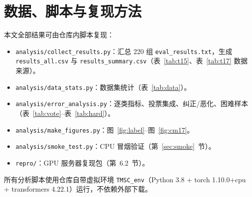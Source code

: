\documentclass[11pt]{ctexart}
\begin{document}
\appendix
\section{数据、脚本与复现方法}

本文全部结果可由仓库内脚本复现：
\begin{itemize}
  \item \texttt{analysis/collect\_results.py}：汇总 220 组 \texttt{eval\_results.txt}，生成 \texttt{results\_all.csv} 与 \texttt{results\_summary.csv}（表~\ref{tab:t15}、表~\ref{tab:t17} 数据来源）。
  \item \texttt{analysis/data\_stats.py}：数据集统计（表~\ref{tab:data}）。
  \item \texttt{analysis/error\_analysis.py}：逐类指标、投票集成、纠正/恶化、困难样本（表~\ref{tab:vote}--表~\ref{tab:hard}）。
  \item \texttt{analysis/make\_figures.py}：图~\ref{fig:label}--图~\ref{fig:cm17}。
  \item \texttt{analysis/smoke\_test.py}：CPU 冒烟验证（第~\ref{sec:smoke}~节）。
  \item \texttt{repro/}：GPU 服务器复现包（第~6.2~节）。
\end{itemize}

所有分析脚本使用仓库自带虚拟环境 \texttt{TMSC\_env}（Python 3.8 + torch 1.10.0+cpu + transformers 4.22.1）运行，不依赖外部下载。
\end{document}
